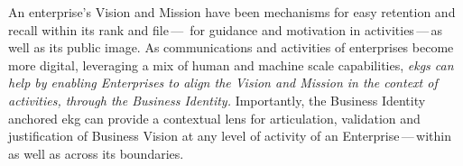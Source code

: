 %
%
An enterprise’s Vision and Mission have been mechanisms for easy
retention and recall within its rank and file\,---\,%
for guidance and motivation in activities\,---\,as well as its public image.
As communications and activities of enterprises become more digital, leveraging a mix of human and machine scale
capabilities, \textit{\glspl{ekg} can help by enabling Enterprises to align the Vision and Mission
in the context of activities, through the Business Identity.}
Importantly, the Business Identity anchored \gls{ekg} can provide a contextual lens for articulation,
validation and justification of Business Vision at any level of activity of an Enterprise\,---\,within as well as
across its boundaries.
